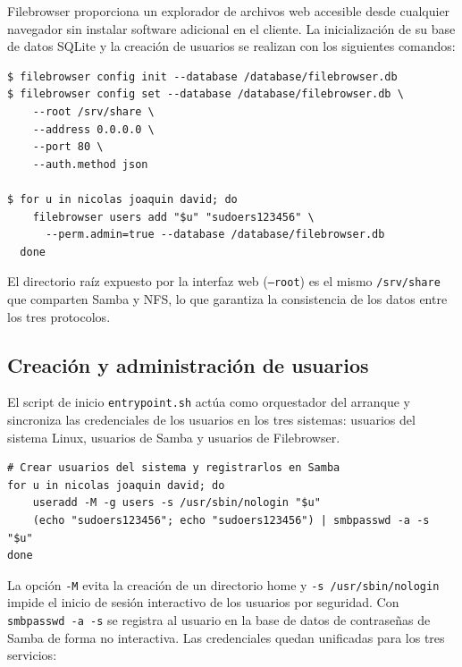 Filebrowser proporciona un explorador de archivos web accesible desde
cualquier navegador sin instalar software adicional en el cliente. La
inicialización de su base de datos SQLite y la creación de usuarios se
realizan con los siguientes comandos:

\begin{lstlisting}[style=terminal]
$ filebrowser config init --database /database/filebrowser.db
$ filebrowser config set --database /database/filebrowser.db \
    --root /srv/share \
    --address 0.0.0.0 \
    --port 80 \
    --auth.method json

$ for u in nicolas joaquin david; do
    filebrowser users add "$u" "sudoers123456" \
      --perm.admin=true --database /database/filebrowser.db
  done
\end{lstlisting}

El directorio raíz expuesto por la interfaz web (\texttt{--root}) es el mismo
\texttt{/srv/share} que comparten Samba y NFS, lo que garantiza la
consistencia de los datos entre los tres protocolos.

\subsection{Creación y administración de usuarios}

El script de inicio \texttt{entrypoint.sh} actúa como orquestador del arranque
y sincroniza las credenciales de los usuarios en los tres sistemas: usuarios
del sistema Linux, usuarios de Samba y usuarios de Filebrowser.

\begin{lstlisting}[style=terminal]
# Crear usuarios del sistema y registrarlos en Samba
for u in nicolas joaquin david; do
    useradd -M -g users -s /usr/sbin/nologin "$u"
    (echo "sudoers123456"; echo "sudoers123456") | smbpasswd -a -s "$u"
done
\end{lstlisting}

La opción \texttt{-M} evita la creación de un directorio home y
\texttt{-s /usr/sbin/nologin} impide el inicio de sesión interactivo de los
usuarios por seguridad. Con \texttt{smbpasswd -a -s} se registra al usuario en
la base de datos de contraseñas de Samba de forma no interactiva. Las
credenciales quedan unificadas para los tres servicios:

